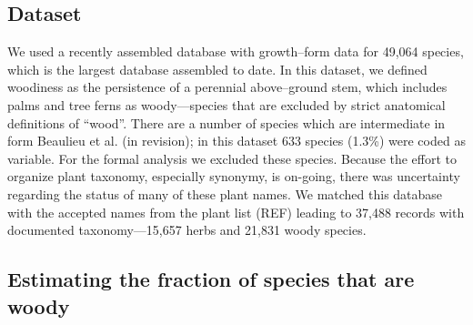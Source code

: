 \documentclass[12pt]{article}
\begin{document}
\subsection{Dataset}

We used a recently assembled database with growth--form data for
49,064 species, which is the largest database assembled to date.  
% 
% 
In this dataset, we defined woodiness as the persistence of a
perennial above--ground stem, which includes palms and tree ferns as
woody---species that are excluded by strict anatomical definitions of
``wood''.  
There are a number of species which are intermediate in form Beaulieu
et al. (in revision); in this dataset 633 species (1.3\%) were coded
as variable.  For the formal analysis we excluded these species.
Because the effort to organize plant taxonomy, especially synonymy, is
on-going, there was uncertainty regarding the status of many of these
plant names.  We matched this database with the accepted names from
the plant list (REF) leading to 37,488 records with documented
taxonomy---15,657 herbs and 21,831 woody species.



\subsection{Estimating the fraction of species that are woody}
\end{document}
